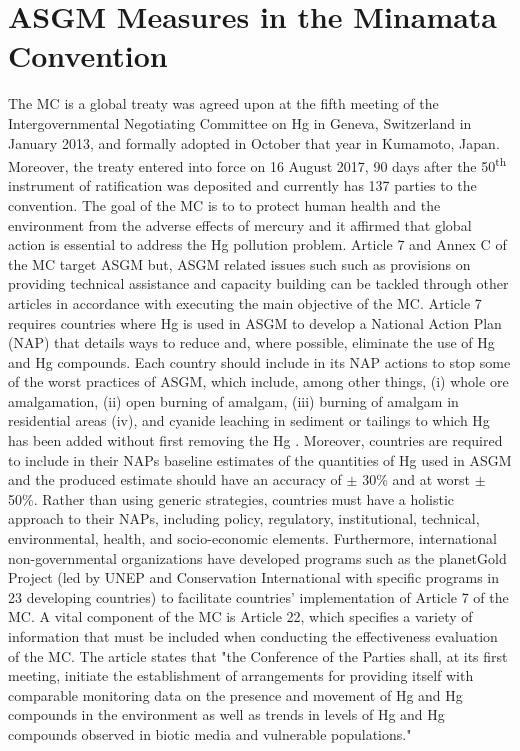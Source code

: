 \section{ASGM Measures in the Minamata Convention}
The MC is a global treaty was agreed upon at the fifth meeting of the Intergovernmental Negotiating Committee on Hg in Geneva, Switzerland in January 2013, and formally adopted in October that year in Kumamoto, Japan. Moreover, the treaty entered into force on 16 August 2017, 90 days after the 50\textsuperscript{th} instrument of ratification was deposited and currently has 137 parties to the convention\cite{unep_minamata_2019}. The goal of the MC is to to protect human health and the environment from the adverse effects of mercury and it affirmed that global action is essential to address the Hg pollution problem. Article 7 and Annex C of the MC target ASGM but, ASGM related issues such such as provisions on providing technical assistance and capacity building can be tackled through other articles in accordance with executing the main objective of the MC. Article 7 requires countries where Hg is used in ASGM to develop a National Action Plan (NAP) that details ways to reduce and, where possible, eliminate the use of Hg and Hg compounds. Each country should include in its NAP actions to stop some of the worst practices of ASGM, which include, among other things, (i) whole ore amalgamation, (ii) open burning of amalgam, (iii) burning of amalgam in residential areas (iv), and cyanide leaching in sediment or tailings to which Hg has been added without first removing the Hg \cite{unep_minamata_2019}. Moreover, countries are required to include in their NAPs baseline estimates of the quantities of Hg used in ASGM and the produced estimate should have an accuracy of $\pm$ 30\% and at worst $\pm$ 50\%\cite{programme_estimating_2017}. Rather than using generic strategies, countries must have a holistic approach to their NAPs, including policy, regulatory, institutional, technical, environmental, health, and socio-economic elements. Furthermore, international non-governmental organizations have developed programs such as the planetGold Project (led by UNEP and Conservation International with specific programs in 23 developing countries) to facilitate countries' implementation of Article 7 of the MC. A vital component of the MC is Article 22, which specifies a variety of information that must be included when conducting the effectiveness evaluation of the MC. The article states that "the Conference of the Parties shall, at its first meeting, initiate the establishment of arrangements for providing itself with comparable monitoring data on the presence and movement of Hg and Hg compounds in the environment as well as trends in levels of Hg and Hg compounds observed in biotic media and vulnerable populations." 

